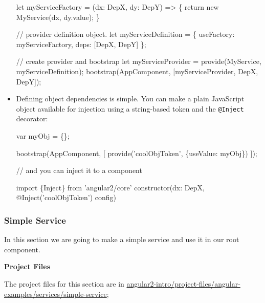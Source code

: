 \documentclass[12pt,]{article}
\newenvironment{Shaded}{}{}
\newcommand{\KeywordTok}[1]{\textcolor[rgb]{0.00,0.00,1.00}{{#1}}}
\newcommand{\CommentTok}[1]{\textcolor[rgb]{0.00,0.50,0.00}{{#1}}}
\newcommand{\FunctionTok}[1]{{#1}}
\newcommand{\NormalTok}[1]{{#1}}
\begin{document}
\begin{itemize}
\begin{Shaded}
\begin{Highlighting}[numbers=left,,]
\NormalTok{let myServiceFactory = (dx: DepX, dy: DepY) => \{}
  \KeywordTok{return} \KeywordTok{new} \FunctionTok{MyService}\NormalTok{(dx, dy.}\FunctionTok{value}\NormalTok{);}
\NormalTok{\}}

\CommentTok{// provider definition object.}
\NormalTok{let myServiceDefinition = \{}
   \NormalTok{useFactory: myServiceFactory,}
   \NormalTok{deps: [DepX, DepY]}
\NormalTok{\};}

\CommentTok{// create provider and bootstrap}
\NormalTok{let myServiceProvider = }\FunctionTok{provide}\NormalTok{(MyService, myServiceDefinition);}
\FunctionTok{bootstrap}\NormalTok{(AppComponent, [myServiceProvider, DepX, DepY]);}
\end{Highlighting}
\end{Shaded}
\item
  Defining object dependencies is simple. You can make a plain
  JavaScript object available for injection using a string-based token
  and the \texttt{@Inject} decorator:

\begin{Shaded}
\begin{Highlighting}[numbers=left,,]
\NormalTok{var myObj = \{\};}

\FunctionTok{bootstrap}\NormalTok{(AppComponent, [}
  \FunctionTok{provide}\NormalTok{('coolObjToken', \{useValue: myObj\})}
\NormalTok{]);}

\CommentTok{// and you can inject it to a component}

\KeywordTok{import} \NormalTok{\{Inject\} from 'angular2/core'}
\FunctionTok{constructor}\NormalTok{(dx: DepX, }\FunctionTok{@Inject}\NormalTok{('coolObjToken') config)}
\end{Highlighting}
\end{Shaded}
\end{itemize}

\subsubsection{Simple Service}\label{simple-service}

In this section we are going to make a simple service and use it in our
root component.

\textbf{Project Files}

The project files for this section are in
\href{https://github.com/st32lth/angular2-intro/tree/master/project-files/angular-examples/services/simple-service}{angular2-intro/project-files/angular-examples/services/simple-service};
\end{document}
